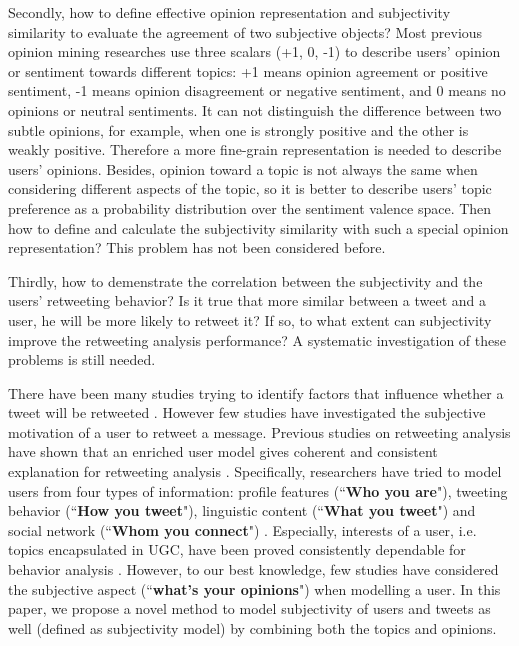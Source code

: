 \documentclass{acm_proc_article-sp}
\begin{document}
Secondly, how to define effective opinion representation and subjectivity similarity to evaluate the agreement of two subjective objects? Most previous opinion mining researches \cite{liu2012sentiment} use three scalars (+1, 0, -1) to describe users' opinion or sentiment towards different topics: +1 means opinion agreement or positive sentiment, -1 means opinion disagreement or negative sentiment, and 0 means no opinions or neutral sentiments. It can not distinguish the difference between two subtle opinions, for example, when one is strongly positive and the other is weakly positive. Therefore a more fine-grain representation is needed to describe users' opinions. Besides, opinion toward a topic is not always the same when considering different aspects of the topic, so it is better to describe users' topic preference as a probability distribution over the sentiment valence space. Then how to define and calculate the subjectivity similarity with such a special opinion representation? This problem has not been considered before. 

Thirdly, how to demenstrate the correlation between the subjectivity and the users' retweeting behavior? Is it true that more similar between a tweet and a user, he will be more likely to retweet it? If so, to what extent can subjectivity improve the retweeting analysis performance? A systematic investigation of these problems is still needed. 

There have been many studies trying to identify factors that influence whether a tweet will be retweeted \cite{boyd2010tweet,kwak2010twitter}. However few studies have investigated the subjective motivation of a user to retweet a message. 
Previous studies on retweeting analysis have shown that an enriched user model gives coherent and consistent explanation for retweeting analysis \cite{macskassy2011people,feng2013retweet}. 
Specifically, researchers have tried to model users from four types of information:
profile features (``\textbf{Who you are}"), tweeting behavior (``\textbf{How you tweet}"), linguistic content (``\textbf{What you tweet}") and social network (``\textbf{Whom you connect}") \cite{pennacchiotti2011machine}. 
Especially, interests of a user, i.e. topics encapsulated in UGC, have been proved consistently dependable for behavior analysis \cite{petrovic2011rt}. 
However, to our best knowledge, few studies have considered the subjective aspect (``\textbf{what's your opinions}") when modelling a user. 
In this paper, we propose a novel method to model subjectivity of users and tweets as well (defined as subjectivity model) by combining both the topics and opinions. 
\end{document}
